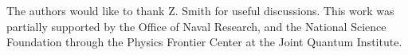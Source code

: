 \documentclass[aip,rsi,reprint]{revtex4-1} %
\begin{document}
The authors would like to thank Z. Smith for useful discussions.
This work was partially supported by the Office of Naval Research, and the National Science Foundation through the Physics Frontier Center at the Joint Quantum Institute.

%



%
%
\end{document}
